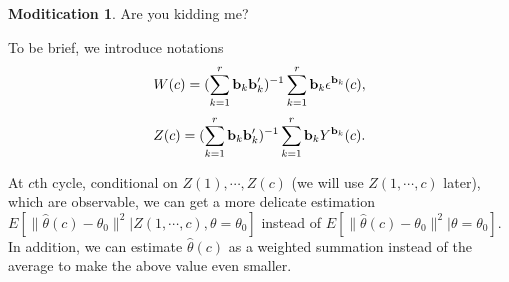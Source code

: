\documentclass{article}
\theoremstyle{plain}
\theoremstyle{definition}
\newtheorem{modification}{Moditication}
\begin{document}

\begin{modification}
Are you kidding me?




To be brief, we introduce notations
 \[W(c)=(\sum_{k=1}^{r}\bold{b}_k\bold{b}_k')^{-1}\sum_{k=1}^{r}\bold{b}_{k}\epsilon^{\bold{b}_k}(c),\] 
 \[Z(c) =(\sum_{k=1}^{r}\bold{b}_k\bold{b}_k')^{-1}\sum_{k=1}^{r}\bold{b}_{k}Y^{\bold{b}_k}(c).\] 

At $c$th cycle, conditional on $Z(1), \cdots, Z(c)$ (we will use $Z(1,\cdots, c)$ later), which are observable, we can get a more delicate estimation $E[\|\hat{\theta}(c)-\theta_0\|^2 | Z(1,\cdots, c), \theta = \theta_0]$ instead of $E[\|\hat{\theta}(c)-\theta_0\|^2|\theta=\theta_0]$. In addition, we can estimate $\hat{\theta}(c)$ as a weighted summation instead of the average to make the above value even smaller.


\end{modification}
\end{document}
